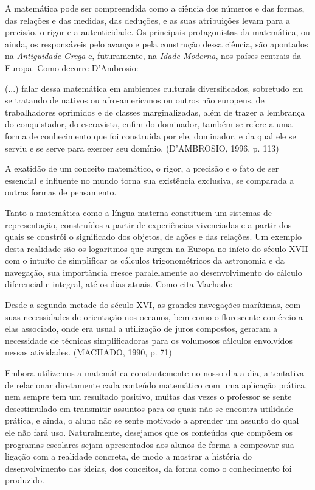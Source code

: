 \documentclass[brasil]{abnt}
\begin{document}
	A matemática pode ser compreendida como a ciência dos números e das formas, das relações e das medidas, das deduções, e as suas atribuições levam para a precisão, o rigor e a autenticidade.
	Os principais protagonistas da matemática, ou ainda, os responsáveis pelo avanço e pela construção dessa ciência, são apontados na \textit{Antiguidade Grega} e, futuramente, na \textit{Idade Moderna}, 
	nos países centrais da Europa. Como decorre D'Ambrosio:
			
		\begin{citacao}(...) falar dessa matemática em ambientes culturais diversificados, sobretudo em se tratando de nativos ou afro-americanos ou outros não europeus, de trabalhadores oprimidos e de classes 
			marginalizadas, além de trazer a lembrança do conquistador, do escravista, enfim do dominador, também se refere a uma forma de conhecimento que foi construída por ele, dominador, e da qual ele se serviu
			e se serve para exercer seu domínio. (D'AMBROSIO, 1996, p. 113)
		\end{citacao}
				  
	A exatidão de um conceito matemático, o rigor, a precisão e o fato de ser essencial e influente no mundo torna sua existência exclusiva, se comparada a outras formas de pensamento. 	
	    
    Tanto a matemática como a língua materna constituem um sistemas de representação, construídos a partir de experiências vivenciadas e a partir dos quais se 
    constrói o significado  dos objetos, de ações e das relações. Um exemplo desta realidade são os logaritmos que surgem na Europa no início do século XVII com 
    o intuito de simplificar os cálculos trigonométricos da astronomia e da navegação, sua importância cresce paralelamente ao desenvolvimento do cálculo 
    diferencial e integral, até os dias atuais. Como cita Machado:
    
		\begin{citacao} Desde a segunda metade do século XVI, as grandes navegações marítimas, com suas necessidades de orientação nos oceanos, bem como o florescente comércio a 
						elas associado, onde era usual a utilização de juros compostos, geraram a necessidade de técnicas simplificadoras para os volumosos cálculos envolvidos nessas 
						atividades. (MACHADO, 1990, p. 71)
		\end{citacao}
    
    Embora utilizemos a matemática constantemente no nosso dia a dia, a tentativa de relacionar diretamente cada conteúdo matemático com uma aplicação prática, 
    nem sempre tem um resultado positivo, muitas das vezes o professor se sente desestimulado em transmitir assuntos para os quais não se encontra utilidade prática, 
    e ainda, o aluno não se sente motivado a aprender um assunto do qual ele não fará uso. Naturalmente, desejamos que os conteúdos que compõem os programas escolares sejam apresentados 
    aos alunos de forma a comprovar sua ligação com a realidade concreta, de  modo a mostrar a história do desenvolvimento das ideias, dos conceitos, da forma como o conhecimento foi produzido.
    
\end{document}
